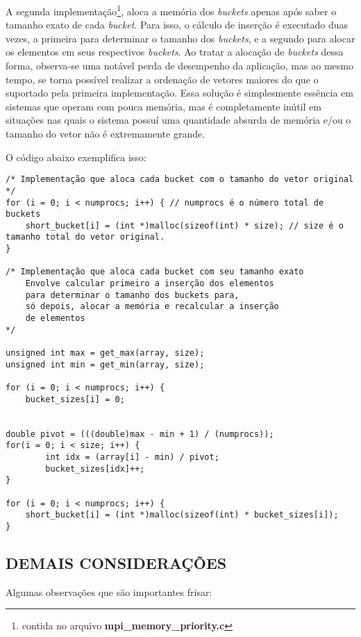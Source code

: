 		A segunda implementação\footnote{contida no arquivo \textbf{mpi\_memory\_priority.c}}, aloca a memória dos \textit{buckets} apenas após saber o tamanho exato de cada \textit{bucket}. Para isso, o cálculo de inserção é executado duas vezes, a primeira para determinar o tamanho dos \textit{buckets}, e a segundo para alocar os elementos em seus respectivos \textit{buckets}. Ao tratar a alocação de \textit{buckets} dessa forma, observa-se uma notável perda de desempenho da aplicação, mas ao mesmo tempo, se torna possível realizar a ordenação de vetores maiores do que o suportado pela primeira implementação. Essa solução é simplesmente essência em sistemas que operam com pouca memória, mas é completamente inútil em situações nas quais o sistema possuí uma quantidade absurda de memória e/ou o tamanho do vetor não é extremamente grande.

		O código abaixo exemplifica isso:
		\begin{lstlisting}[style=C]
/* Implementação que aloca cada bucket com o tamanho do vetor original */
for (i = 0; i < numprocs; i++) { // numprocs é o número total de buckets
	short_bucket[i] = (int *)malloc(sizeof(int) * size); // size é o tamanho total do vetor original.
}

/* Implementação que aloca cada bucket com seu tamanho exato 
	Envolve calcular primeiro a inserção dos elementos 
	para determinar o tamanho dos buckets para,
	só depois, alocar a memória e recalcular a inserção
	de elementos	
*/

unsigned int max = get_max(array, size);
unsigned int min = get_min(array, size);

for (i = 0; i < numprocs; i++) {
	bucket_sizes[i] = 0;


double pivot = (((double)max - min + 1) / (numprocs));
for(i = 0; i < size; i++) {
    	int idx = (array[i] - min) / pivot;
    	bucket_sizes[idx]++;
}

for (i = 0; i < numprocs; i++) {
	short_bucket[i] = (int *)malloc(sizeof(int) * bucket_sizes[i]);
}
\end{lstlisting}
		
	\subsection{\normalsize DEMAIS CONSIDERAÇÕES}
		Algumas observações que são importantes frisar:
		
